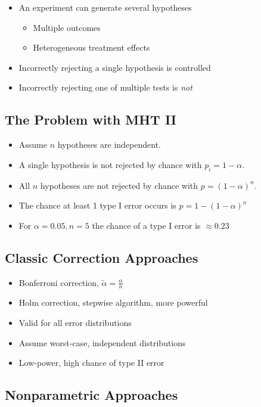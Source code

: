 \documentclass[10pt]{article}
\begin{document}
	\begin{itemize}
		\item An experiment can generate several hypotheses
			\begin{itemize}
				\item Multiple outcomes
				\item Heterogeneous treatment effects
			\end{itemize}
		\item Incorrectly rejecting a single hypothesis is controlled
		\item Incorrectly rejecting one of multiple tests is \emph{not}
	\end{itemize}

	\subsection{The Problem with MHT II}

	\begin{itemize}
		\item Assume $n$ hypotheses are independent.
		\item A single hypothesis is not rejected by chance with $p_i = 1-\alpha$.
		\item All $n$ hypotheses are not rejected by chance with $p = (1-\alpha)^n$.
		\item The chance at least 1 type I error occurs is $p = 1 - (1-\alpha)^n$
		\item For $\alpha=0.05, n=5$ the chance of a type I error is $\approx 0.23$
	\end{itemize}

	\subsection[Classic Correction Approaches]{Classic Correction Approaches}

	\begin{itemize}
		\item Bonferroni correction, $\tilde{\alpha} = \frac{\alpha}{n}$
		\item Holm correction, stepwise algorithm, more powerful
		\item Valid for all error distributions
		\item Assume worst-case, independent distributions
		\item Low-power, high chance of type II error
	\end{itemize}

	\subsection[Nonparametric Approaches]{Nonparametric Approaches}
\end{document}
